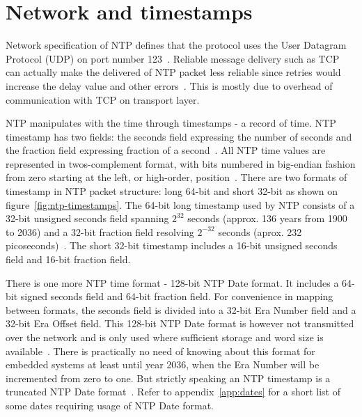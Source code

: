 
\section{Network and timestamps}\label{sec:ntp-network}
Network specification of NTP defines that
the protocol uses the User Datagram Protocol (UDP) on port number 123~\cite{ianna-ports,rfc5905}.
Reliable message delivery such as TCP can actually make the delivered of
NTP packet less reliable since retries
would increase the delay value and other errors~\cite{rfc5905}.
This is mostly due to overhead of communication with TCP on transport layer.

NTP manipulates with the time through timestamps - a record of time.
NTP timestamp has two fields: the seconds field expressing the number of seconds
and the fraction field expressing fraction of a second~\cite{rfc5905}.
All NTP time values are represented in twos-complement format, with
bits numbered in big-endian fashion from zero starting at the left, or high-order, position~\cite{rfc5905}. 
There are two formats of timestamp in NTP packet structure:
long 64-bit and short 32-bit as shown on figure~\ref{fig:ntp-timestamps}.
The 64-bit long timestamp used by NTP consists of a 32-bit unsigned seconds
field spanning $2^{32}$ seconds (approx. 136 years from 1900 to 2036) and a 32-bit fraction field resolving
$2^{-32}$ seconds (aprox. 232 picoseconds)~\cite{rfc5905}.
The short 32-bit timestamp includes a 16-bit unsigned seconds field
and 16-bit fraction field.

There is one more NTP time format - 128-bit NTP Date format.
It includes a 64-bit signed seconds field and 64-bit fraction field.
For convenience in mapping between formats,
the seconds field is divided into a 32-bit Era Number field
and a 32-bit Era Offset field.
This 128-bit NTP Date format is however not transmitted over the network
and is only used where sufficient storage and word
size is available~\cite{rfc5905}.
There is practically no need of knowing about this format for embedded systems
at least until year 2036, when the Era Number will be incremented from zero to one.
But strictly speaking an NTP timestamp is a truncated NTP Date format~\cite{rfc5905}.
Refer to appendix~\ref{app:dates} for a short list of some dates
requiring usage of NTP Date format.

